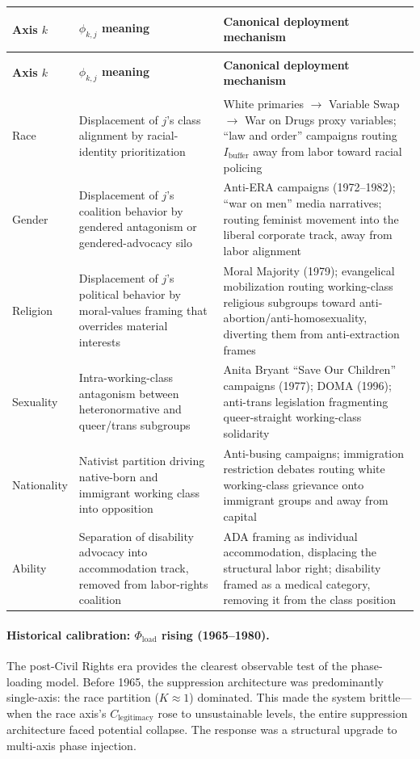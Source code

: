 \begin{longtable}{>{\bfseries\raggedright}p{2.0cm} >{\raggedright}p{3.5cm} >{\raggedright\arraybackslash}p{7.5cm}}
\toprule
\textbf{Axis $k$} & \textbf{$\phi_{k,j}$ meaning} & \textbf{Canonical deployment mechanism} \\
\midrule
\endfirsthead
\toprule
\textbf{Axis $k$} & \textbf{$\phi_{k,j}$ meaning} & \textbf{Canonical deployment mechanism} \\
\midrule
\endhead
Race &
Displacement of $j$'s class alignment by racial-identity prioritization &
White primaries $\to$ Variable Swap $\to$ War on Drugs proxy variables; ``law and order'' campaigns routing $I_{\text{buffer}}$ away from labor toward racial policing \\
\midrule
Gender &
Displacement of $j$'s coalition behavior by gendered antagonism or gendered-advocacy silo &
Anti-ERA campaigns (1972--1982); ``war on men'' media narratives; routing feminist movement into the liberal corporate track, away from labor alignment \\
\midrule
Religion &
Displacement of $j$'s political behavior by moral-values framing that overrides material interests &
Moral Majority (1979); evangelical mobilization routing working-class religious subgroups toward anti-abortion/anti-homosexuality, diverting them from anti-extraction frames \\
\midrule
Sexuality &
Intra-working-class antagonism between heteronormative and queer/trans subgroups &
Anita Bryant ``Save Our Children'' campaigns (1977); DOMA (1996); anti-trans legislation fragmenting queer-straight working-class solidarity \\
\midrule
Nationality &
Nativist partition driving native-born and immigrant working class into opposition &
Anti-busing campaigns; immigration restriction debates routing white working-class grievance onto immigrant groups and away from capital \\
\midrule
Ability &
Separation of disability advocacy into accommodation track, removed from labor-rights coalition &
ADA framing as individual accommodation, displacing the structural labor right; disability framed as a medical category, removing it from the class position \\
\bottomrule
\end{longtable}

\paragraph{Historical calibration: $\Phi_{\text{load}}$ rising (1965--1980).}
The post-Civil Rights era provides the clearest observable test of the phase-loading model. Before 1965, the suppression architecture was predominantly single-axis: the race partition ($K \approx 1$) dominated. This made the system brittle---when the race axis's $C_{\text{legitimacy}}$ rose to unsustainable levels, the entire suppression architecture faced potential collapse. The response was a structural upgrade to multi-axis phase injection.

